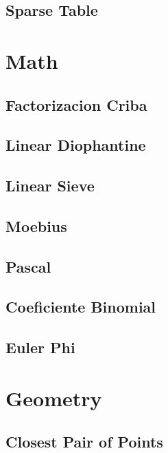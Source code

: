 \subsection{   Sparse Table}
\raggedbottom
\hrulefill

\section{Math}
\subsection{	Factorizacion Criba}
\raggedbottom
\hrulefill
\subsection{	Linear Diophantine}
\raggedbottom
\hrulefill
\subsection{	Linear Sieve}
\raggedbottom
\hrulefill
\subsection{	Moebius}
\raggedbottom
\hrulefill
\subsection{	Pascal}
\raggedbottom
\hrulefill
\subsection{	Coeficiente Binomial}
\raggedbottom
\hrulefill
\subsection{	Euler Phi}
\raggedbottom
\hrulefill

\section{Geometry}
\subsection{	Closest Pair of Points}
\raggedbottom
\hrulefill
